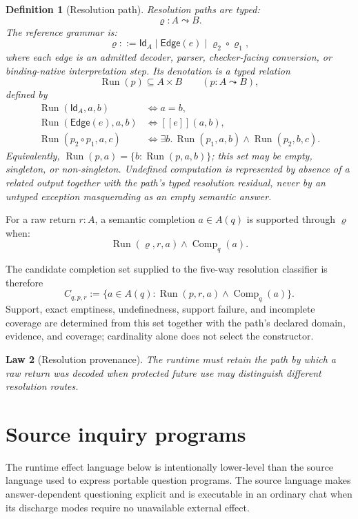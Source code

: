 \documentclass[11pt,oneside]{article}
\newtheorem{definition}{Definition}[section]
\newtheorem{law}[definition]{Law}
\newcommand{\Comp}{\operatorname{Comp}}
\newcommand{\ResPath}{\varrho}
\newcommand{\den}[1]{[\![#1]\!]}
\begin{document}
\begin{definition}[Resolution path]
Resolution paths are typed:
\[
\boxed{
\ResPath:A\leadsto B.
}
\]
The reference grammar is:
\[
\ResPath::=
\mathsf{Id}_A
\mid
\mathsf{Edge}(e)
\mid
\ResPath_2\circ\ResPath_1,
\]
where each edge is an admitted decoder, parser, checker-facing conversion, or binding-native interpretation step.
Its denotation is a typed relation
\[
\boxed{
\operatorname{Run}(p)\subseteq A\times B
\qquad(p:A\leadsto B),
}
\]
defined by
\[
\begin{aligned}
\operatorname{Run}(\mathsf{Id}_A,a,b)
&\iff a=b,\\
\operatorname{Run}(\mathsf{Edge}(e),a,b)
&\iff \den{e}(a,b),\\
\operatorname{Run}(p_2\circ p_1,a,c)
&\iff \exists b.\,
\operatorname{Run}(p_1,a,b)\land\operatorname{Run}(p_2,b,c).
\end{aligned}
\]
Equivalently,
\(\operatorname{Run}(p,a)=\{b:\operatorname{Run}(p,a,b)\}\); this set may be empty,
singleton, or non-singleton.  Undefined computation is represented by absence of a related output
together with the path's typed resolution residual, never by an untyped exception masquerading as
an empty semantic answer.
\end{definition}

For a raw return \(r:A\), a semantic completion \(a\in A(q)\) is supported through
\(\ResPath\) when:
\[
\boxed{
\operatorname{Run}(\ResPath,r,a)
\land
\Comp_q(a).
}
\]

The candidate completion set supplied to the five-way resolution classifier is therefore
\[
\boxed{
C_{q,p,r}:=
\{a\in A(q):\operatorname{Run}(p,r,a)\land\Comp_q(a)\}.
}
\]
Support, exact emptiness, undefinedness, support failure, and incomplete coverage are determined
from this set together with the path's declared domain, evidence, and coverage; cardinality alone
does not select the constructor.

\begin{law}[Resolution provenance]
The runtime must retain the path by which a raw return was decoded when protected future use may distinguish different resolution routes.
\end{law}


\section{Source inquiry programs}

The runtime effect language below is intentionally lower-level than the source language used to express portable question programs.  The source language makes answer-dependent questioning explicit and is executable in an ordinary chat when its discharge modes require no unavailable external effect.
\end{document}
